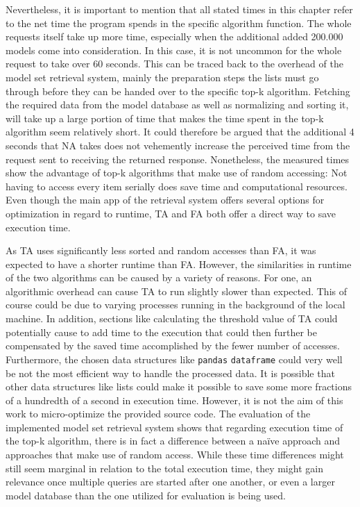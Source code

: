 Nevertheless, it is important to mention that all stated times in this chapter refer to the net time the program spends in the specific algorithm function. The whole requests itself take up more time, especially when the additional added 200.000 models come into consideration. In this case, it is not uncommon for the whole request to take over 60 seconds. This can be traced back to the overhead of the model set retrieval system, mainly the preparation steps the lists must go through before they can be handed over to the specific top-k algorithm. Fetching the required data from the model database as well as normalizing and sorting it, will take up a large portion of time that makes the time spent in the top-k algorithm seem relatively short. It could therefore be argued that the additional 4 seconds that NA takes does not vehemently increase the perceived time from the request sent to receiving the returned response. Nonetheless, the measured times show the advantage of top-k algorithms that make use of random accessing: Not having to access every item serially does save time and computational resources. Even though the main app of the retrieval system offers several options for optimization in regard to runtime, TA and FA both offer a direct way to save execution time. 

As TA uses significantly less sorted and random accesses than FA, it was expected to have a shorter runtime than FA. However, the similarities in runtime of the two algorithms can be caused by a variety of reasons. For one, an algorithmic overhead can cause TA to run slightly slower than expected. This of course could be due to varying processes running in the background of the local machine. In addition, sections like calculating the threshold value of TA could potentially cause to add time to the execution that could then further be compensated by the saved time accomplished by the fewer number of accesses. Furthermore, the chosen data structures like \texttt{pandas} \texttt{dataframe} could very well be not the most efficient way to handle the processed data. It is possible that other data structures like lists could make it possible to save some more fractions of a hundredth of a second in execution time. However, it is not the aim of this work to micro-optimize the provided source code. The evaluation of the implemented model set retrieval system shows that regarding execution time of the top-k algorithm, there is in fact a difference between a naïve approach and approaches that make use of random access. While these time differences might still seem marginal in relation to the total execution time, they might gain relevance once multiple queries are started after one another, or even a larger model database than the one utilized for evaluation is being used.
  
